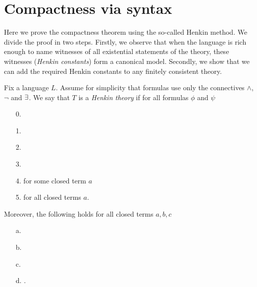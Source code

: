 \section{Compactness via syntax}

Here we prove the compactness theorem using the so-called Henkin method. We divide the proof in two steps. Firstly, we observe that when the language is rich enough to name witnesses of all existential statements of the theory, these witnesses (\textit{Henkin constants\/}) form a canonical model. Secondly, we show that we can add the required Henkin constants to any finitely consistent theory.

\begin{definition}\label{def_Henkin}
Fix a language $L$.
Assume for simplicity that formulas use only the connectives $\wedge$, $\neg$ and $\exists$.
We say that $T$ is a \emph{Henkin theory\/} if for all formulas $\phi$ and $\psi$

\begin{itemize}
\item[0.]
\item[1.]
\item[2.]
\item[3.]
\item[4.]\quad for some closed term $a$
\item[5.]\quad for all closed terms $a$.
\end{itemize}
Moreover, the following holds for all closed terms $a, b, c$
\begin{itemize}
\item[a.] 
\item[b.] 
\item[c.] 
\item[d.] .
\end{itemize}
\end{definition}

